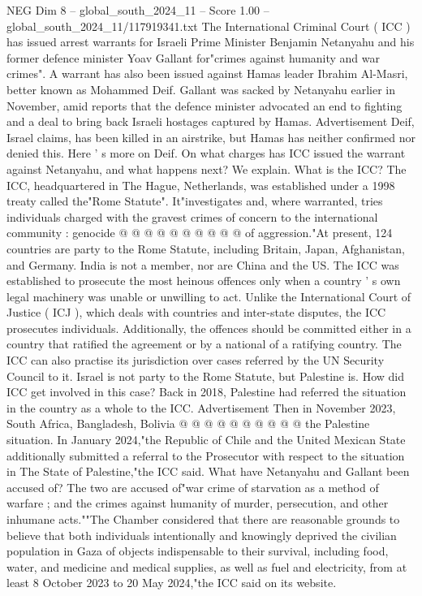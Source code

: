 \begin{textsample}{NEG Dim 8 – global\_south\_2024\_11 – Score 1.00 – global\_south\_2024\_11/117919341.txt}  \label{ex:f8_neg_319}
The International Criminal Court ( ICC ) has issued arrest warrants for Israeli Prime Minister Benjamin Netanyahu and his former defence minister Yoav Gallant for"crimes against humanity and war crimes".
A warrant has also been issued against Hamas leader Ibrahim Al-Masri, better known as Mohammed Deif.
Gallant was sacked by Netanyahu earlier in November, amid reports that the defence minister advocated an end to fighting and a deal to bring back Israeli hostages captured by Hamas.
Advertisement Deif, Israel claims, has been killed in an airstrike, but Hamas has neither confirmed nor denied this.
Here ' s more on Deif.
On what charges has ICC issued the warrant against Netanyahu, and what happens next?
We explain.
What is the ICC?
The ICC, headquartered in The Hague, Netherlands, was established under a 1998 treaty called the"Rome Statute".
It"investigates and, where warranted, tries individuals charged with the gravest crimes of concern to the international community : genocide @ @ @ @ @ @ @ @ @ @ of aggression."At present, 124 countries are party to the Rome Statute, including Britain, Japan, Afghanistan, and Germany.
India is not a member, nor are China and the US.
The ICC was established to prosecute the most heinous offences only when a country ' s own legal machinery was unable or unwilling to act.
Unlike the International Court of Justice ( ICJ ), which deals with countries and inter-state disputes, the ICC prosecutes individuals.
Additionally, the offences should be committed either in a country that ratified the agreement or by a national of a ratifying country.
The ICC can also practise its jurisdiction over cases referred by the UN Security Council to it.
Israel is not party to the Rome Statute, but Palestine is.
How did ICC get involved in this case?
Back in 2018, Palestine had referred the situation in the country as a whole to the ICC.
Advertisement Then in November 2023, South Africa, Bangladesh, Bolivia @ @ @ @ @ @ @ @ @ @ the Palestine situation.
In January 2024,"the Republic of Chile and the United Mexican State additionally submitted a referral to the Prosecutor with respect to the situation in The State of Palestine,"the ICC said.
What have Netanyahu and Gallant been accused of?
The two are accused of"war crime of starvation as a method of warfare ; and the crimes against humanity of murder, persecution, and other inhumane acts.""The Chamber considered that there are reasonable grounds to believe that both individuals intentionally and knowingly deprived the civilian population in Gaza of objects indispensable to their survival, including food, water, and medicine and medical supplies, as well as fuel and electricity, from at least 8 October 2023 to 20 May 2024,"the ICC said on its website.

\end{textsample}

